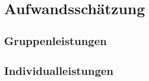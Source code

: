 \chapter{Aufwandsschätzung}\label{ch:aufwandsschatzung}
\newcommand{\trschaetzung}[3]{\rowcolor{lightgray}\multicolumn{1}{|l|}{\textbf{#1}} & \textbf{#2} \\* \multicolumn{2}{|l|}{\begin{tabular}[c]{@{}l@{}}#3\end{tabular}} \\ \hline}

\section{Gruppenleistungen}\label{sec:gruppenleistungen}


\section{Individualleistungen}\label{sec:individualleistungen}


